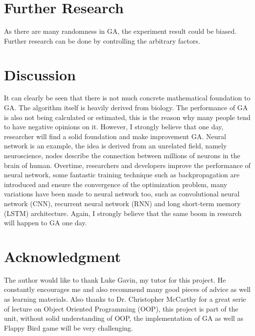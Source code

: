 \documentclass[conference]{IEEEtran}
\begin{document}
\section{Further Research}
\indent
As there are many randomness in GA, the experiment result could be biased. Further research can be done by controlling the arbitrary factors. 
\section{Discussion}
\indent
It can clearly be seen that there is not much concrete mathematical foundation to GA. The algorithm itself is heavily derived from biology. The performance of GA is also not being calculated or estimated, this is the reason why many people tend to have negative opinions on it. However, I strongly believe that one day, researcher will find a solid foundation and make improvement GA. Neural network is an example, the idea is derived from an unrelated field, namely neuroscience, nodes describe the connection between millions of neurons in the brain of human. Overtime, researchers and developers improve the performance of neural network, some fantastic training technique such as backpropagation are introduced and ensure the convergence of the optimization problem, many variations have been made to neural network too, such as convolutional neural network (CNN), recurrent neural network (RNN) and long short-term memory (LSTM) architecture. Again, I strongly believe that the same boom in research will happen to GA one day.
\section*{Acknowledgment}
\indent
The author would like to thank Luke Gavin, my tutor for this project. He constantly encourages me and also recommend many good pieces of advice as well as learning materials. Also thanks to Dr. Christopher McCarthy for a great serie of lecture on Object Oriented Programming (OOP), this project is part of the unit, without solid understanding of OOP, the implementation of GA as well as Flappy Bird game will be very challenging.
\end{document}
